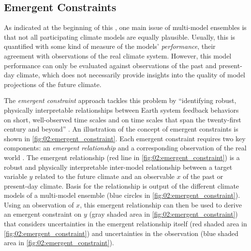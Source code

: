 \subsection{Emergent Constraints}
\label{subsec:02:emergent_constraints}

As indicated at the beginning of this ,
one main issue of multi-model ensembles is that not all participating climate
models are equally plausible. Usually, this is quantified with some kind of
measure of the models' \emph{performance}, \ie{} their agreement with
observations of the real climate system. However, this model performance can
only be evaluated against observations of the past and present-day climate,
which does not necessarily provide insights into the quality of model
projections of the future climate.

The \emph{emergent constraint} approach tackles this problem by
\enquote{identifying robust, physically interpretable relationships between
  Earth system feedback behaviors on short, well-observed time scales and on
  time scales that span the twenty-first century and beyond}
\autocite{Eyring2019}. An illustration of the concept of emergent constraints
is shown in \cref{fig:02:emergent_constraint}. Each emergent constraint
requires two key components: an \emph{emergent relationship} and a
corresponding observation of the real world \autocite{Eyring2019}. The emergent
relationship (red line in \cref{fig:02:emergent_constraint}) is a robust and
physically interpretable inter-model relationship between a target variable $y$
related to the future climate and an observable $x$ of the past or present-day
climate. Basis for the relationship is output of the different climate models
of a multi-model ensemble (blue circles in \cref{fig:02:emergent_constraint}).
Using an observation of $x$, this emergent relationship can then be used to
derive an emergent constraint on $y$ (gray shaded area in
\cref{fig:02:emergent_constraint}) that considers uncertainties in the emergent
relationship itself (red shaded area in \cref{fig:02:emergent_constraint}) and
uncertainties in the observation (blue shaded area in
\cref{fig:02:emergent_constraint}).

